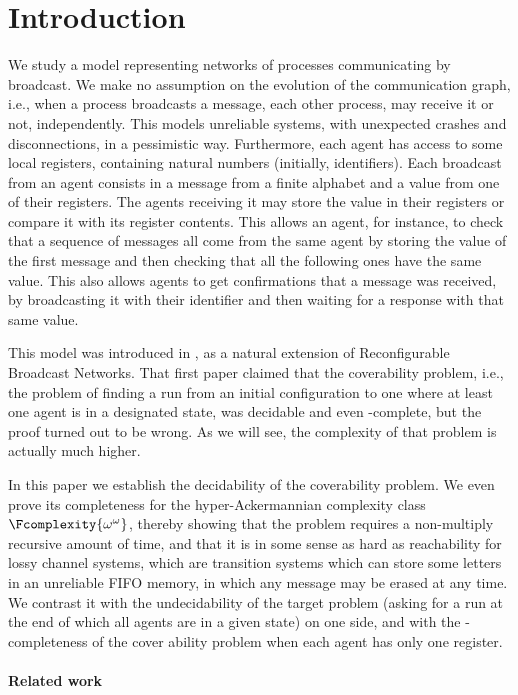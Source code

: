 \section{Introduction}

We study a model representing networks of processes communicating by broadcast. We make no assumption on the evolution of the communication graph, i.e., when a process broadcasts a message, each other process, may receive it or not, independently. This models unreliable systems, with unexpected crashes and disconnections, in a pessimistic way. 
Furthermore, each agent has access to some local registers, containing natural numbers (initially, identifiers). Each broadcast from an agent consists in a message from a finite alphabet and a value from one of their registers. The agents receiving it may store the value in their registers or compare it with its register contents. 
This allows an agent, for instance, to check that a sequence of messages all come from the same agent by storing the value of the first message and then checking that all the following ones have the same value.
This also allows agents to get confirmations that a message was received, by broadcasting it with their identifier and then waiting for a response with that same value.

This model was introduced in \cite{DST2013}, as a natural extension of Reconfigurable Broadcast Networks. That first paper claimed that the coverability problem, i.e., the problem of finding a run from an initial configuration to one where at least one agent is in a designated state, was decidable and even \PSPACE-complete, but the proof turned out to be wrong. As we will see, the complexity of that problem is actually much higher.

In this paper we establish the decidability of the coverability problem. We even prove its completeness for the hyper-Ackermannian complexity class $\Fcomplexity{\omega^\omega}$, thereby showing that the problem requires a non-multiply recursive amount of time, and that it is in some sense as hard as reachability for lossy channel systems, which are transition systems which can store some letters in an unreliable FIFO memory, in which any message may be erased at any time. 
We contrast it with the undecidability of the target problem (asking for a run at the end of which all agents are in a given state) on one side, and with the \NP-completeness of the cover ability problem when each agent has only one register. 

\paragraph*{Related work}

